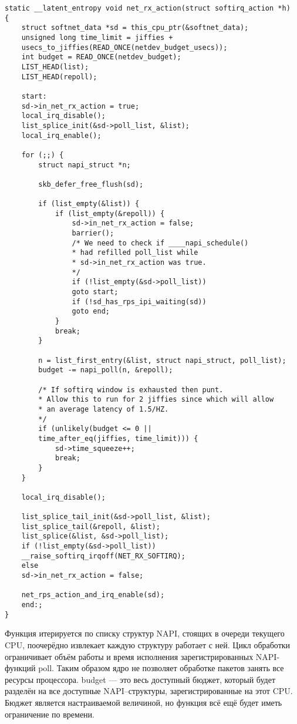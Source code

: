 \begin{center}
	\captionsetup{justification=raggedright,singlelinecheck=off}
	\begin{lstlisting}[label=lst:net_rx_action,caption=Функция net\_rx\_action,showstringspaces=false]
static __latent_entropy void net_rx_action(struct softirq_action *h)
{
	struct softnet_data *sd = this_cpu_ptr(&softnet_data);
	unsigned long time_limit = jiffies +
	usecs_to_jiffies(READ_ONCE(netdev_budget_usecs));
	int budget = READ_ONCE(netdev_budget);
	LIST_HEAD(list);
	LIST_HEAD(repoll);
	
	start:
	sd->in_net_rx_action = true;
	local_irq_disable();
	list_splice_init(&sd->poll_list, &list);
	local_irq_enable();
	
	for (;;) {
		struct napi_struct *n;
		
		skb_defer_free_flush(sd);
		
		if (list_empty(&list)) {
			if (list_empty(&repoll)) {
				sd->in_net_rx_action = false;
				barrier();
				/* We need to check if ____napi_schedule()
				* had refilled poll_list while
				* sd->in_net_rx_action was true.
				*/
				if (!list_empty(&sd->poll_list))
				goto start;
				if (!sd_has_rps_ipi_waiting(sd))
				goto end;
			}
			break;
		}
		
		n = list_first_entry(&list, struct napi_struct, poll_list);
		budget -= napi_poll(n, &repoll);
		
		/* If softirq window is exhausted then punt.
		* Allow this to run for 2 jiffies since which will allow
		* an average latency of 1.5/HZ.
		*/
		if (unlikely(budget <= 0 ||
		time_after_eq(jiffies, time_limit))) {
			sd->time_squeeze++;
			break;
		}
	}
	
	local_irq_disable();
	
	list_splice_tail_init(&sd->poll_list, &list);
	list_splice_tail(&repoll, &list);
	list_splice(&list, &sd->poll_list);
	if (!list_empty(&sd->poll_list))
	__raise_softirq_irqoff(NET_RX_SOFTIRQ);
	else
	sd->in_net_rx_action = false;
	
	net_rps_action_and_irq_enable(sd);
	end:;
}
	\end{lstlisting}
\end{center}
\FloatBarrier

Функция итерируется по списку структур NAPI, стоящих в очереди текущего CPU, поочерёдно извлекает каждую структуру работает с ней. Цикл обработки ограничивает объём работы и время исполнения зарегистрированных NAPI-функций poll. Таким образом ядро не позволяет обработке пакетов занять все ресурсы процессора. budget — это весь доступный бюджет, который будет разделён на все доступные NAPI--структуры, зарегистрированные на этот CPU. Бюджет является настраиваемой величиной, но функция всё ещё будет иметь ограничение по времени.

